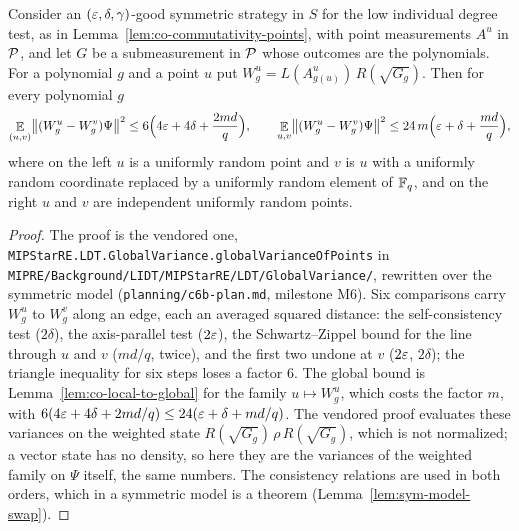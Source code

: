 \begin{lemma}
\label{lem:co-global-variance-of-points}
\leanok
Consider an $(\eps, \delta, \gamma)$-good symmetric strategy in $S$ for the low individual degree
test, as in Lemma~\ref{lem:co-commutativity-points}, with point measurements $A^u$ in $\cal{P}$,
and let $G$ be a submeasurement in $\cal{P}$ whose outcomes are the polynomials. For a polynomial
$g$ and a point $u$ put $W^u_g = L(A^u_{g(u)})\, R(\sqrt{G_g})$. Then for every polynomial $g$
\[
  \E_{(u, v)} \bigl\| (W^u_g - W^v_g) \Psi \bigr\|^2 \leq 6 \Bigl(4 \eps + 4 \delta + \frac{2md}{q}
  \Bigr), \qquad \E_{u, v} \bigl\| (W^u_g - W^v_g) \Psi \bigr\|^2 \leq 24\, m \Bigl(\eps + \delta +
  \frac{md}{q}\Bigr),
\]
where on the left $u$ is a uniformly random point and $v$ is $u$ with a uniformly random coordinate
replaced by a uniformly random element of $\Fq$, and on the right $u$ and $v$ are independent
uniformly random points.
\end{lemma}

\begin{proof}
\leanok
The proof is the vendored one, \texttt{MIPStarRE.LDT.GlobalVariance.globalVarianceOfPoints} in
\texttt{MIPRE/Background/LIDT/MIPStarRE/LDT/GlobalVariance/}, rewritten over the symmetric model
(\texttt{planning/c6b-plan.md}, milestone M6). Six comparisons carry $W^u_g$ to $W^v_g$ along an
edge, each an averaged squared distance: the self-consistency test ($2\delta$), the axis-parallel
test ($2\eps$), the Schwartz--Zippel bound for the line through $u$ and $v$ ($md/q$, twice), and
the first two undone at $v$ ($2\eps$, $2\delta$); the triangle inequality for six steps loses a
factor $6$. The global bound is Lemma~\ref{lem:co-local-to-global} for the family $u \mapsto
W^u_g$, which costs the factor $m$, with $6 (4\eps + 4\delta + 2md/q) \leq 24 (\eps + \delta +
md/q)$. The vendored proof evaluates these variances on the weighted state $R(\sqrt{G_g})\, \rho\,
R(\sqrt{G_g})$, which is not normalized; a vector state has no density, so here they are the
variances of the weighted family on $\Psi$ itself, the same numbers. The consistency relations are
used in both orders, which in a symmetric model is a theorem
(Lemma~\ref{lem:sym-model-swap}).
\end{proof}

